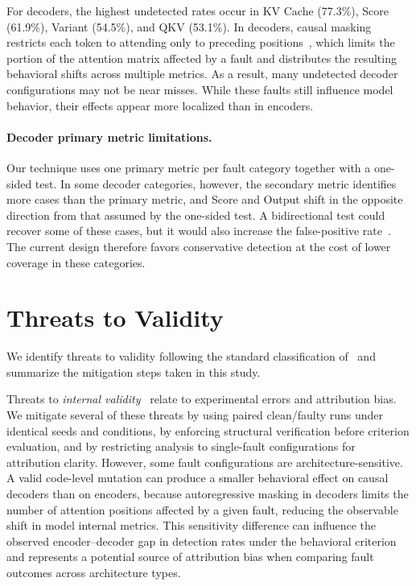 For decoders, the highest undetected rates occur in KV Cache (77.3\%), Score (61.9\%), Variant (54.5\%), and QKV (53.1\%). In decoders, causal masking restricts each token to attending only to preceding positions~\cite{vaswani2017attention}, which limits the portion of the attention matrix affected by a fault and distributes the resulting behavioral shifts across multiple metrics. As a result, many undetected decoder configurations may not be near misses. While these faults still influence model behavior, their effects appear more localized than in encoders.

\paragraph{Decoder primary metric limitations.}
Our technique uses one primary metric per fault category together with a one-sided test. In some decoder categories, however, the secondary metric identifies more cases than the primary metric, and Score and Output shift in the opposite direction from that assumed by the one-sided test. A bidirectional test could recover some of these cases, but it would also increase the false-positive rate~\citep{good2005permutation}. The current design therefore favors conservative detection at the cost of lower coverage in these categories.


\section{Threats to Validity}
\label{sec:threats}
We identify threats to validity following the standard classification of~\citet{wohlin2012experimentation} and summarize the mitigation steps taken in this study.

Threats to \emph{internal validity}~\cite{internalvalidity} relate to experimental errors and attribution bias. We mitigate several of these threats by using paired clean/faulty runs under identical seeds and conditions, by enforcing structural verification before criterion evaluation, and by restricting analysis to single-fault configurations for attribution clarity. However, some fault configurations are architecture-sensitive. A valid code-level mutation can produce a smaller behavioral effect on causal decoders than on encoders, because autoregressive masking in decoders limits the number of attention positions affected by a given fault, reducing the observable shift in model internal metrics. This sensitivity difference can influence the observed encoder--decoder gap in detection rates under the behavioral criterion and represents a potential source of attribution bias when comparing fault outcomes across architecture types.


